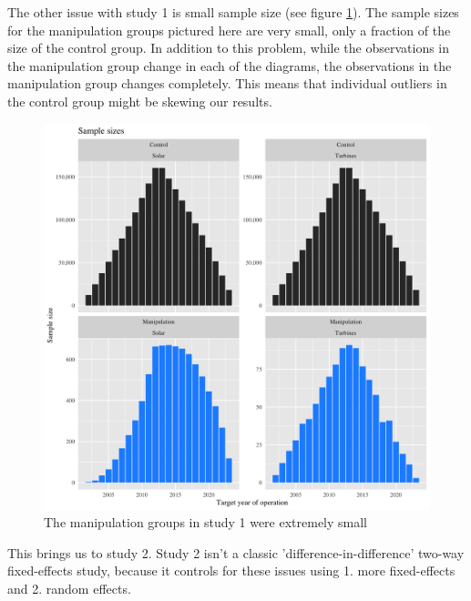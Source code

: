 \documentclass{article}
\begin{document}
The other issue with study 1 is small sample size (see figure \ref{study1samplesize}). 
The sample sizes for the manipulation groups pictured here are very small, only a fraction of the size of the control group.
In addition to this problem, while the observations in the manipulation group change in each of the diagrams, the observations in the manipulation group changes completely. 
This means that individual outliers in the control group might be skewing our results.
\begin{figure}[h]
\centering
\includegraphics[width=0.9\linewidth]
{study1_sample_size.png} 
\caption{The manipulation groups in study 1 were extremely small}
\label{study1samplesize}
\end{figure}

This brings us to study 2.
Study 2 isn't a classic 'difference-in-difference' two-way fixed-effects study, because it controls for these issues using 1. more fixed-effects and 2. random effects.
\end{document}
